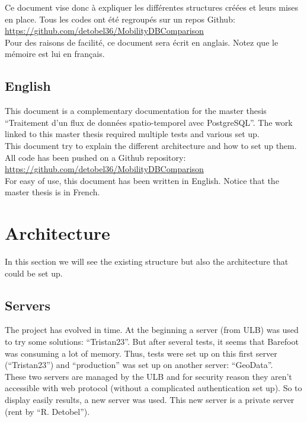 \documentclass[a4paper,12pt]{article}
\begin{document}
        Ce document vise donc à expliquer les différentes structures créées et leurs mises en place. Tous les codes ont été regroupés sur un repos Github: \url{https://github.com/detobel36/MobilityDBComparison}\\
        Pour des raisons de facilité, ce document sera écrit en anglais. Notez que le mémoire est lui en français.
        
        
    \subsection{English}
        This document is a complementary documentation for the master thesis ``Traitement d'un flux de données spatio-temporel avec PostgreSQL''. The work linked to this master thesis required multiple tests and various set up.\\
        
        This document try to explain the different architecture and how to set up them. All code has been pushed on a Github repository: \url{https://github.com/detobel36/MobilityDBComparison}\\
        For easy of use, this document has been written in English. Notice that the master thesis is in French.

        
\section{Architecture}
    In this section we will see the existing structure but also the architecture that could be set up.
    
    \subsection{Servers}
        The project has evolved in time. At the beginning a server (from ULB) was used to try some solutions: ``Tristan23''. But after several tests, it seems that Barefoot was consuming a lot of memory. Thus, tests were set up on this first server (``Tristan23'') and ``production'' was set up on another server: ``GeoData''.\\
        
        These two servers are managed by the ULB and for security reason they aren't accessible with web protocol (without a complicated authentication set up). So to display easily results, a new server was used. This new server is a private server (rent by ``R. Detobel'').\\
        
\end{document}
